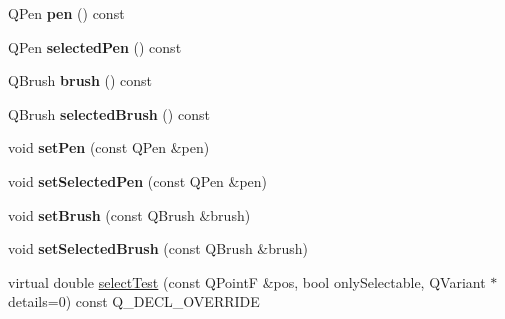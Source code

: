 \begin{DoxyCompactItemize}
\item 
\mbox{\label{class_q_c_p_item_ellipse_a8288f7ce760fc795f5ce4e61136bda19}} 
Q\+Pen {\bfseries pen} () const
\item 
\mbox{\label{class_q_c_p_item_ellipse_a9a200af2797356b45479b601d75437ee}} 
Q\+Pen {\bfseries selected\+Pen} () const
\item 
\mbox{\label{class_q_c_p_item_ellipse_aacf45d032f204d0df3dd0bfdf1172cd3}} 
Q\+Brush {\bfseries brush} () const
\item 
\mbox{\label{class_q_c_p_item_ellipse_afeda9d8e2e6da216a3c3366d87e80feb}} 
Q\+Brush {\bfseries selected\+Brush} () const
\item 
\mbox{\label{class_q_c_p_item_ellipse_adb81a663ed2420fcfa011e49f678d1a6}} 
void {\bfseries set\+Pen} (const Q\+Pen \&pen)
\item 
\mbox{\label{class_q_c_p_item_ellipse_a6c542fba1dc918041c583f58a50dde99}} 
void {\bfseries set\+Selected\+Pen} (const Q\+Pen \&pen)
\item 
\mbox{\label{class_q_c_p_item_ellipse_a49fc74e6965834e873d027d026def798}} 
void {\bfseries set\+Brush} (const Q\+Brush \&brush)
\item 
\mbox{\label{class_q_c_p_item_ellipse_a9693501cfaa43a099655c75bed0dab3f}} 
void {\bfseries set\+Selected\+Brush} (const Q\+Brush \&brush)
\item 
virtual double \hyperlink{class_q_c_p_item_ellipse_adae105786cd2f5dbc557c8846a0ec994}{select\+Test} (const Q\+PointF \&pos, bool only\+Selectable, Q\+Variant $\ast$details=0) const Q\+\_\+\+D\+E\+C\+L\+\_\+\+O\+V\+E\+R\+R\+I\+DE
\end{DoxyCompactItemize}
